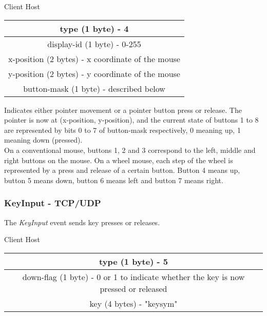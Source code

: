 \documentclass{article}
\begin{document}
    \begin{center}
        Client \textrightarrow Host\\
        \begin{tabular}{|c|}
            \hline
            type (1 byte) - 4                                \\
            \hline
            display-id (1 byte) - 0-255                      \\
            \hline
            x-position (2 bytes) - x coordinate of the mouse \\
            \hline
            y-position (2 bytes) - y coordinate of the mouse \\
            \hline
            button-mask (1 byte) - described below           \\
            \hline
        \end{tabular}
    \end{center}

    Indicates either pointer movement or a pointer button press or release. The pointer is now at (x-position, y-position), and the current state of buttons 1 to 8 are represented by bits 0 to 7 of button-mask respectively, 0 meaning up, 1 meaning down (pressed).\\

    On a conventional mouse, buttons 1, 2 and 3 correspond to the left, middle and right buttons on the mouse. On a wheel mouse, each step of the wheel is represented by a press and release of a certain button. Button 4 means up, button 5 means down, button 6 means left and button 7 means right.

    \subsubsection{KeyInput - TCP/UDP}

    The \emph{KeyInput} event sends key presses or releases.

    \begin{center}
        Client \textrightarrow Host\\
        \begin{tabular}{|c|}
            \hline
            type (1 byte) - 5                                                                  \\
            \hline
            down-flag (1 byte) - 0 or 1 to indicate whether the key is now pressed or released \\
            \hline
            key (4 bytes) - "keysym"                                                           \\
            \hline
        \end{tabular}
    \end{center}
\end{document}

